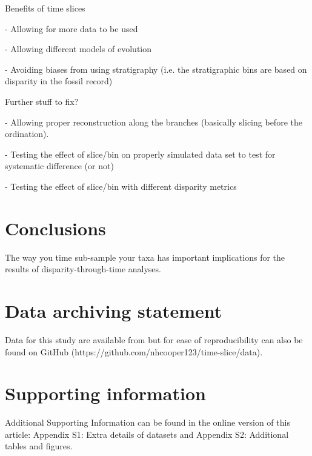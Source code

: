 \documentclass[12pt,a4paper]{article}
\begin{document}


Benefits of time slices

  - Allowing for more data to be used

  - Allowing different models of evolution

  - Avoiding biases from using stratigraphy (i.e. the stratigraphic bins are based on disparity in the fossil record)

Further stuff to fix?

  - Allowing proper reconstruction along the branches (basically slicing before the ordination).

  - Testing the effect of slice/bin on properly simulated data set to test for systematic difference (or not)

  - Testing the effect of slice/bin with different disparity metrics



\section{Conclusions}
The way you time sub-sample your taxa has important implications for the results of disparity-through-time analyses.

\section{Data archiving statement}
Data for this study are available from \cite{dryad_n2g80,dryad_6hb7j,dryad_84t75,beckancient2014} but for ease of reproducibility can also be found on GitHub (https://github.com/nhcooper123/time-slice/data).

\section{Supporting information}
Additional Supporting Information can be found in the online version of this article:
Appendix S1: Extra details of datasets and Appendix S2: Additional tables and figures.
\end{document}
